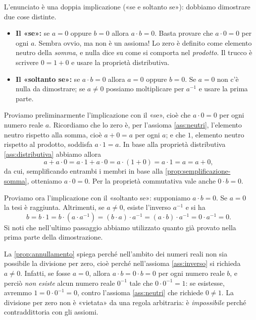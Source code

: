 \begin{schema}
\end{schema}

\begin{strategia}
L'enunciato è una doppia implicazione («se e soltanto se»): dobbiamo dimostrare due
cose distinte.
\begin{itemize}
  \item \textbf{Il «se»:} se $a=0$ oppure $b=0$ allora $a\cdot b=0$. Basta provare che
  $a\cdot0=0$ per ogni $a$. Sembra ovvio, ma non è un assioma! Lo zero è definito come
  elemento neutro della \emph{somma}, e nulla dice su come si comporta nel
  \emph{prodotto}. Il trucco è scrivere $0=1+0$ e usare la proprietà distributiva.
  \item \textbf{Il «soltanto se»:} se $a\cdot b=0$ allora $a=0$ oppure $b=0$. Se $a=0$
  non c'è nulla da dimostrare; se $a\neq0$ possiamo moltiplicare per $a^{-1}$ e usare la
  prima parte.
\end{itemize}
\end{strategia}

\begin{dimostrazione}
Proviamo preliminarmente l'implicazione con il «se», cioè che $a\cdot0=0$ per ogni
numero reale $a$. Ricordiamo che lo zero è, per l'assioma \ref{ass:neutri}, l'elemento
neutro rispetto alla somma, cioè $a+0=a$ per ogni $a$; e che $1$, elemento neutro
rispetto al prodotto, soddisfa $a\cdot1=a$. In base alla proprietà distributiva
\ref{ass:distributiva} abbiamo allora
\[
  a + a\cdot0 = a\cdot1 + a\cdot0 = a\cdot(1+0) = a\cdot1 = a = a+0,
\]
da cui, semplificando entrambi i membri in base alla
\cref{prop:semplificazione-somma}, otteniamo $a\cdot0=0$. Per la proprietà commutativa
vale anche $0\cdot b=0$.

Proviamo ora l'implicazione con il «soltanto se»: supponiamo $a\cdot b=0$. Se $a=0$
la tesi è raggiunta. Altrimenti, se $a\neq0$, esiste l'inverso $a^{-1}$ e si ha
\[
  b = b\cdot1 = b\cdot(a\cdot a^{-1}) = (b\cdot a)\cdot a^{-1}
    = (a\cdot b)\cdot a^{-1} = 0\cdot a^{-1} = 0 .
\]
Si noti che nell'ultimo passaggio abbiamo utilizzato quanto già provato nella prima
parte della dimostrazione.
\end{dimostrazione}

\begin{osservazione}
La \cref{prop:annullamento} spiega perché nell'ambito dei numeri reali non sia
possibile la divisione per zero, cioè perché nell'assioma \ref{ass:inverso} si richieda
$a\neq0$. Infatti, se fosse $a=0$, allora $a\cdot b=0\cdot b=0$ per ogni numero reale
$b$, e perciò \emph{non esiste} alcun numero reale $0^{-1}$ tale che $0\cdot0^{-1}=1$:
se esistesse, avremmo $1=0\cdot0^{-1}=0$, contro l'assioma \ref{ass:neutri} che
richiede $0\neq1$. La divisione per zero non è «vietata» da una regola arbitraria: è
\emph{impossibile} perché contraddittoria con gli assiomi.
\end{osservazione}


